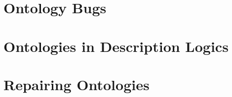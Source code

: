 \section{Ontology Bugs} \label{ontology-bugs}



\section{Ontologies in Description Logics} \label{ontologies-in-dl}



\section{Repairing Ontologies} \label{ontology-repair}


